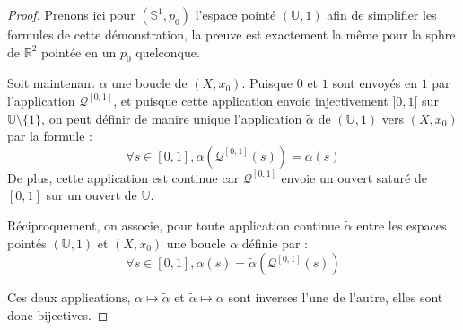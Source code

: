 \begin{proof}
Prenons ici pour $(\mathbb{S}^1,p_0)$ l'espace point\'e $(\mathbb{U},1)$ afin de simplifier les formules de cette d\'emonstration, %
la preuve est exactement la m\^eme pour la sphre de $\mathbb{R}^2$ point\'ee en un $p_0$ quelconque.

Soit maintenant $\alpha$ une boucle de $(X,x_0)$. %
Puisque $0$ et $1$ sont envoy\'es en $1$ par l'application $\mathcal{Q}^{[0,1]}$, %
et puisque cette application envoie injectivement $]0,1[$ sur $\mathbb{U}\setminus\{1\}$, %
on peut d\'efinir de manire unique l'application $\tilde{\alpha}$ de $(\mathbb{U},1)$ vers $(X,x_0)$ par la formule :
\[\forall s \in [0,1],\tilde{\alpha}\left(\mathcal{Q}^{[0,1]}(s)\right)=\alpha (s)\]
De plus, cette application est continue car $\mathcal{Q}^{[0,1]}$ envoie un ouvert satur\'e de $[0,1]$ sur un ouvert de $\mathbb{U}$.

R\'eciproquement, on associe, pour toute application continue $\tilde{\alpha}$ entre les espaces point\'es $(\mathbb{U},1)$ et $(X,x_0)$ %
une boucle $\alpha$ d\'efinie par :
\[\forall s\in [0,1],\alpha(s)=\tilde{\alpha}\left(\mathcal{Q}^{[0,1]}(s)\right)\]

Ces deux applications, $\alpha\mapsto\tilde{\alpha}$ et $\tilde{\alpha}\mapsto\alpha$ sont inverses l'une de l'autre, elles sont donc bijectives.


\end{proof}
